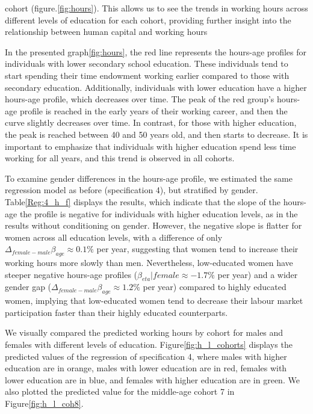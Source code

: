 \documentclass[12pt]{article}
\begin{document}
cohort (figure.\ref{fig:hours}). This allows us to see the trends in working hours across different levels of education
for each cohort, providing further insight into the relationship between human capital and working hours
\par
In the presented graph\ref{fig:hours}, the red line represents the hours-age profiles for individuals with lower secondary school
education. These individuals tend to start spending their time endowment working earlier compared to those with
secondary education. Additionally, individuals with lower education have a higher hours-age profile, which decreases
over time. The peak of the red group's hours-age profile is reached in the early years of their working career, and then
the curve slightly decreases over time. In contrast, for those with higher education, the peak is reached between 40 and
50 years old, and then starts to decrease. It is important to emphasize that individuals with higher education spend
less time working for all years, and this trend is observed in all cohorts.
\par
To examine gender differences in the hours-age profile, we estimated the same regression model as before (specification
4), but stratified by gender. Table\ref{Reg:4_h_f} displays the results, which indicate that the slope of the hours-age
the profile is negative for individuals with higher education levels, as in the results without conditioning on gender.
However, the negative slope is flatter for women across all education levels, with a difference of only
$\Delta_{female-male}\beta_{age} \approx 0.1\%$ per year, suggesting that women tend to increase their working hours more
slowly than men. Nevertheless, low-educated women have steeper negative hours-age profiles ($\beta_{eta}|female \approx
-1.7\%$ per year) and a wider gender gap ($\Delta_{female-male}\beta_{age} \approx 1.2\%$ per year) compared to highly
educated women, implying that low-educated women tend to decrease their labour market participation faster than their
highly educated counterparts.

\par
We visually compared the predicted working hours by cohort for males and females with different levels of education.
Figure\ref{fig:h_l_cohorts} displays the predicted values of the regression of specification 4, where males with higher
education are in orange, males with lower education are in red, females with lower education are in blue, and females
with higher education are in green. We also plotted the predicted value for the middle-age cohort 7 in Figure\ref{fig:h_l_coh8}.
\end{document}
